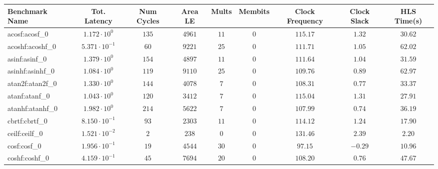 \begin{tabular}{|l|c|c|c|c|c|c|c|c|}
\hline
Benchmark Name               & Tot. Latency            & Num Cycles & Area LE    & Mults   & Membits  & Clock Frequency & Clock Slack & HLS Time(s) \\
\hline
acosf:acosf\_0               & $ 1.172 \cdot 10^{0}  $ & $ 135    $ & $ 4961   $ & $ 11  $ & $ 0    $ & $ 115.17      $ & $ 1.32    $ & $ 30.62   $ \\
acoshf:acoshf\_0             & $ 5.371 \cdot 10^{-1} $ & $ 60     $ & $ 9221   $ & $ 25  $ & $ 0    $ & $ 111.71      $ & $ 1.05    $ & $ 62.02   $ \\
asinf:asinf\_0               & $ 1.379 \cdot 10^{0}  $ & $ 154    $ & $ 4897   $ & $ 11  $ & $ 0    $ & $ 111.64      $ & $ 1.04    $ & $ 31.59   $ \\
asinhf:asinhf\_0             & $ 1.084 \cdot 10^{0}  $ & $ 119    $ & $ 9110   $ & $ 25  $ & $ 0    $ & $ 109.76      $ & $ 0.89    $ & $ 62.97   $ \\
atan2f:atan2f\_0             & $ 1.330 \cdot 10^{0}  $ & $ 144    $ & $ 4078   $ & $ 7   $ & $ 0    $ & $ 108.31      $ & $ 0.77    $ & $ 33.37   $ \\
atanf:atanf\_0               & $ 1.043 \cdot 10^{0}  $ & $ 120    $ & $ 3412   $ & $ 7   $ & $ 0    $ & $ 115.04      $ & $ 1.31    $ & $ 27.91   $ \\
atanhf:atanhf\_0             & $ 1.982 \cdot 10^{0}  $ & $ 214    $ & $ 5622   $ & $ 7   $ & $ 0    $ & $ 107.99      $ & $ 0.74    $ & $ 36.19   $ \\
cbrtf:cbrtf\_0               & $ 8.150 \cdot 10^{-1} $ & $ 93     $ & $ 2303   $ & $ 11  $ & $ 0    $ & $ 114.12      $ & $ 1.24    $ & $ 17.90   $ \\
ceilf:ceilf\_0               & $ 1.521 \cdot 10^{-2} $ & $ 2      $ & $ 238    $ & $ 0   $ & $ 0    $ & $ 131.46      $ & $ 2.39    $ & $ 2.20    $ \\
cosf:cosf\_0                 & $ 1.956 \cdot 10^{-1} $ & $ 19     $ & $ 4544   $ & $ 30  $ & $ 0    $ & $ 97.15       $ & $ -0.29   $ & $ 10.96   $ \\
coshf:coshf\_0               & $ 4.159 \cdot 10^{-1} $ & $ 45     $ & $ 7694   $ & $ 20  $ & $ 0    $ & $ 108.20      $ & $ 0.76    $ & $ 47.67   $ \\

\end{tabular}
